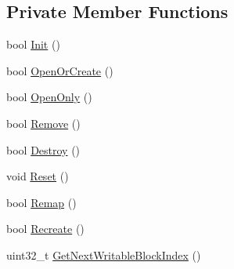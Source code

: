 \subsection*{Private Member Functions}
\begin{DoxyCompactItemize}
\item 
bool \hyperlink{classapollo_1_1cyber_1_1transport_1_1Segment_ac6c53b504e1efce7911645f1fd6ac648}{Init} ()
\item 
bool \hyperlink{classapollo_1_1cyber_1_1transport_1_1Segment_ae4aa98aa23e3facbb4f3dc0c277ab794}{Open\-Or\-Create} ()
\item 
bool \hyperlink{classapollo_1_1cyber_1_1transport_1_1Segment_af248b5091c49a0d46bcbbaa4bf57f5a2}{Open\-Only} ()
\item 
bool \hyperlink{classapollo_1_1cyber_1_1transport_1_1Segment_abfb32828a2d829f04a6a15a57c5a6331}{Remove} ()
\item 
bool \hyperlink{classapollo_1_1cyber_1_1transport_1_1Segment_aed7bc6467a6dc566751314d1e99b8eb2}{Destroy} ()
\item 
void \hyperlink{classapollo_1_1cyber_1_1transport_1_1Segment_a66a6d2f771fb2f663a32180430c4f403}{Reset} ()
\item 
bool \hyperlink{classapollo_1_1cyber_1_1transport_1_1Segment_a5068dd354c9857a512cae26f3cead8be}{Remap} ()
\item 
bool \hyperlink{classapollo_1_1cyber_1_1transport_1_1Segment_a554aa287f3534b59bd635d4897350507}{Recreate} ()
\item 
uint32\-\_\-t \hyperlink{classapollo_1_1cyber_1_1transport_1_1Segment_a916f0eaad7b8201e717238fdd81ab6a6}{Get\-Next\-Writable\-Block\-Index} ()
\end{DoxyCompactItemize}
